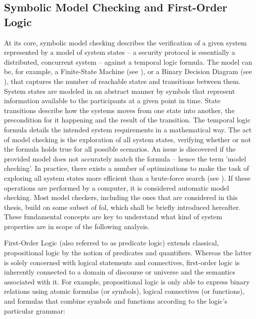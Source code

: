 \subsection{Symbolic Model Checking and First-Order Logic}
\label{ssec:symbolic}

At its core, symbolic model checking describes the verification of a given system represented by a model of system states – a security protocol is essentially a distributed, concurrent system – against a temporal logic formula.
The model can be, for example, a Finite-State Machine (see \cite{alur1998model}), or a Binary Decision Diagram (see \cite{burch1992symbolic}), that captures the number of reachable states and transitions between them.
System states are modeled in an abstract manner by symbols that represent information available to the participants at a given point in time.
State transitions describe how the systems moves from one state into another, the precondition for it happening and the result of the transition.
The temporal logic formula details the intended system requirements in a mathematical way.
The act of model checking is the exploration of all system states, verifying whether or not the formula holds true for all possible scenarios.
An issue is discovered if the provided model does not accurately match the formula – hence the term 'model checking'.
In practice, there exists a number of optimizations to make the task of exploring all system states more efficient than a brute-force search (see \cite{etessami2000optimizing}).
If these operations are performed by a computer, it is considered automatic model checking.
Most model checkers, including the ones that are considered in this thesis, build on some subset of \gls{fol}, which shall be briefly introduced hereafter.
These fundamental concepts are key to understand what kind of system properties are in scope of the following analysis.


First-Order Logic (also referred to as predicate logic) extends classical, propositional logic by the notion of predicates and quantifiers.
Whereas the latter is solely concerned with logical statements and connectives, first-order logic is inherently connected to a domain of discourse or universe and the semantics associated with it.
For example, propositional logic is only able to express binary relations using atomic formulas (or symbols), logical connectives (or functions), and formulas that combine symbols and functions according to the logic's particular grammar:

